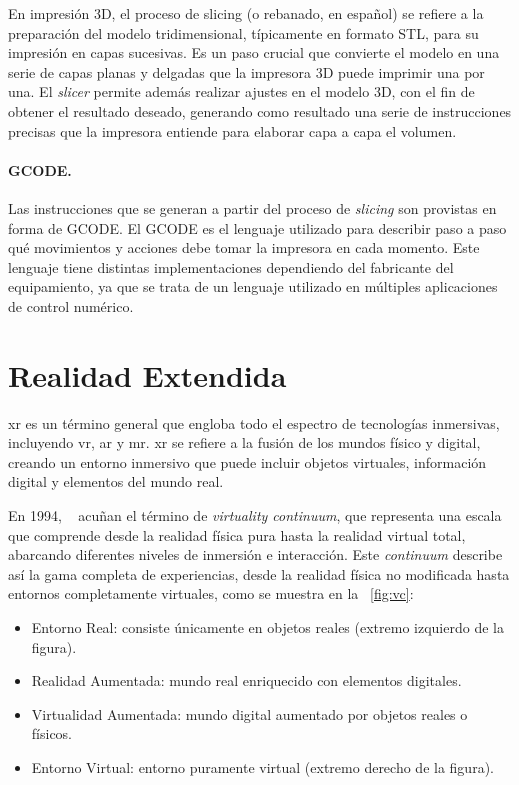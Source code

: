 En impresión 3D, el proceso de slicing (o rebanado, en español) se refiere a la preparación del modelo tridimensional, típicamente en formato STL, para su impresión en capas sucesivas. Es un paso crucial que convierte el modelo en una serie de capas planas y delgadas que la impresora 3D puede imprimir una por una.
El \emph{slicer} permite además realizar ajustes en el modelo 3D, con el fin de obtener el resultado deseado, generando como resultado una serie de instrucciones precisas que la impresora entiende para elaborar capa a capa el volumen.

\paragraph{GCODE.} Las instrucciones que se generan a partir del proceso de \emph{slicing} son provistas en forma de GCODE. El GCODE es el lenguaje utilizado para describir paso a paso qué movimientos y acciones debe tomar la impresora en cada momento. Este lenguaje tiene distintas implementaciones dependiendo del fabricante del equipamiento, ya que se trata de un lenguaje utilizado en múltiples aplicaciones de control numérico.

\section{Realidad Extendida}

\gls{xr} es un término general que engloba todo el espectro de tecnologías inmersivas, incluyendo \gls{vr}, \gls{ar} y \gls{mr}. \gls{xr} se refiere a la fusión de los mundos físico y digital, creando un entorno inmersivo que puede incluir objetos virtuales, información digital y elementos del mundo real.

En 1994, \citeauthor{Milgram1994ATO}~\cite{Milgram1994ATO} acuñan el término de \emph{virtuality continuum}, que representa una escala que comprende desde la realidad física pura hasta la realidad virtual total, abarcando diferentes niveles de inmersión e interacción. Este \emph{continuum} describe así la gama completa de experiencias, desde la realidad física no modificada hasta entornos completamente virtuales, como se muestra en la \figurename~\ref{fig:vc}:
\begin{itemize}
	\item Entorno Real: consiste únicamente en objetos reales (extremo izquierdo de la figura).
	\item Realidad Aumentada: mundo real enriquecido con elementos digitales.
	\item Virtualidad Aumentada: mundo digital aumentado por objetos reales o físicos.
	\item Entorno Virtual: entorno puramente virtual (extremo derecho de la figura).
\end{itemize}

